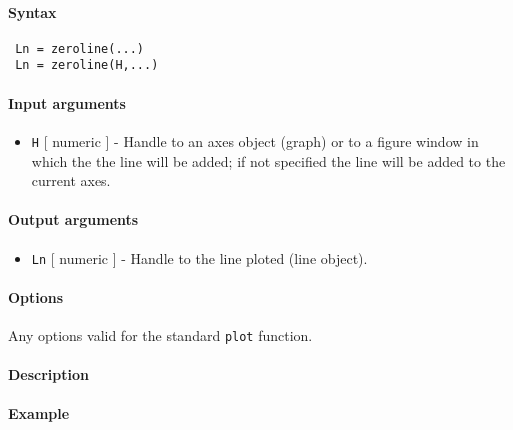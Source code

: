 


	\paragraph{Syntax}
 
 \begin{verbatim}
 Ln = zeroline(...)
 Ln = zeroline(H,...)
 \end{verbatim}
 
 \paragraph{Input arguments}
 
 \begin{itemize}
 \item
   \texttt{H} {[} numeric {]} - Handle to an axes object (graph) or to a
   figure window in which the the line will be added; if not specified
   the line will be added to the current axes.
 \end{itemize}
 
 \paragraph{Output arguments}
 
 \begin{itemize}
 \item
   \texttt{Ln} {[} numeric {]} - Handle to the line ploted (line object).
 \end{itemize}
 
 \paragraph{Options}
 
 Any options valid for the standard \texttt{plot} function.
 
 \paragraph{Description}
 
 \paragraph{Example}


